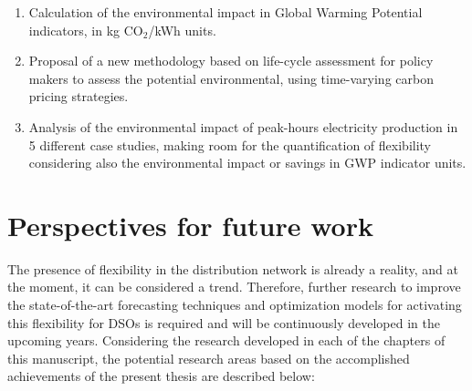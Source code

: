 \begin{itemize}
\begin{enumerate}
		\item Calculation of the environmental impact in Global Warming Potential indicators, in kg CO$_2$/kWh units. 
		\item Proposal of a new methodology based on life-cycle assessment for policy makers to assess the potential environmental, using time-varying carbon pricing strategies. 
		\item Analysis of the environmental impact of peak-hours electricity production in 5 different case studies, making room for the quantification of flexibility considering also the environmental impact or savings in GWP indicator units. 
	\end{enumerate}
\end{itemize}


\section{Perspectives for future work}
The presence of flexibility in the distribution network is already a reality, and at the moment, it can be considered a trend. Therefore, further research to improve the state-of-the-art forecasting techniques and optimization models for activating this flexibility for DSOs is required and will be continuously developed in the upcoming years. 
Considering the research developed in each of the chapters of this manuscript, the potential research areas based on the accomplished achievements of the present thesis are described below: 

